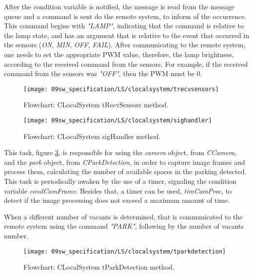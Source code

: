 After the condition variable is notified, the message is read from the message queue and a command is sent do the remote system, to inform of the occurrence. This command begins with \textit{"LAMP"}, indicating that the command is relative to the lamp state, and has an argument that is relative to the event that occurred in the sensors (\textit{ON}, \textit{MIN}, \textit{OFF}, \textit{FAIL}). After communicating to the remote system, one needs to set the appropriate PWM value, therefore, the lamp brightness, according to the received command from the sensors. For example, if the received command from the sensors was \textit{"OFF"}, then the PWM must be 0. 

\begin{figure}[H]
	\centering
	\texttt{[image: 09sw\_specification/LS/clocalsystem/trecvsensors]}
	\caption{Flowchart: CLocalSystem tRecvSensors method.}
	\label{fig:CLocalSystemtRecvSensors}
\end{figure}

\begin{figure}[H]
	\centering
	\texttt{[image: 09sw\_specification/LS/clocalsystem/sighandler]}
	\caption{Flowchart: CLocalSystem sigHandler method.}
	\label{fig:CLocalSystemsigHandler}
\end{figure}

\clearpage
This task, figure \ref{fig:CLocalSystemtParkDetection}, is responsible for using the \textit{camera} object, from \textit{CCamera}, and the \textit{park} object, from \textit{CParkDetection}, in order to capture image frames and process them, calculating the number of available spaces in the parking detected. This task is periodically awaken by the use of a timer, signaling the condition variable \textit{condCamFrame}. Besides that, a timer can be used, \textit{timCamProc}, to detect if the image processing does not exceed a maximum amount of time.

When a different number of vacants is determined, that is communicated to the remote system using the command \textit{"PARK"}, following by the number of vacants number.

\begin{figure}[H]
	\centering
	\texttt{[image: 09sw\_specification/LS/clocalsystem/tparkdetection]}
	\caption{Flowchart: CLocalSystem tParkDetection method.}
	\label{fig:CLocalSystemtParkDetection}
\end{figure}

\clearpage
{}

